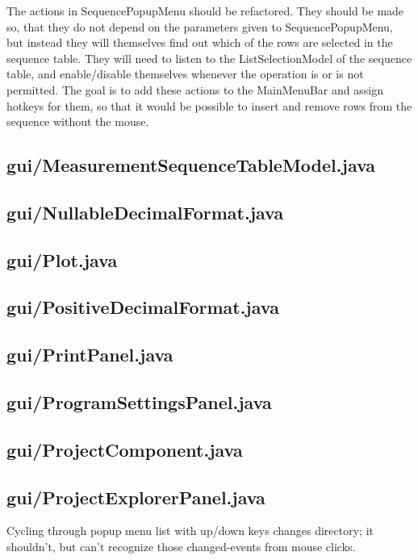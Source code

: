 The actions in SequencePopupMenu should be refactored. They should be made so, that they do not depend on the parameters given to SequencePopupMenu, but instead they will themselves find out which of the rows are selected in the sequence table. They will need to listen to the ListSelectionModel of the sequence table, and enable/disable themselves whenever the operation is or is not permitted. The goal is to add these actions to the MainMenuBar and assign hotkeys for them, so that it would be possible to insert and remove rows from the sequence without the mouse.


\subsection{gui/MeasurementSequenceTableModel.java}

\subsection{gui/NullableDecimalFormat.java}

\subsection{gui/Plot.java}

\subsection{gui/PositiveDecimalFormat.java}

\subsection{gui/PrintPanel.java}

\subsection{gui/ProgramSettingsPanel.java}

\subsection{gui/ProjectComponent.java}


\subsection{gui/ProjectExplorerPanel.java}

Cycling through popup menu list with up/down keys changes directory; it shouldn't, but can't recognize those changed-events from mouse clicks.

